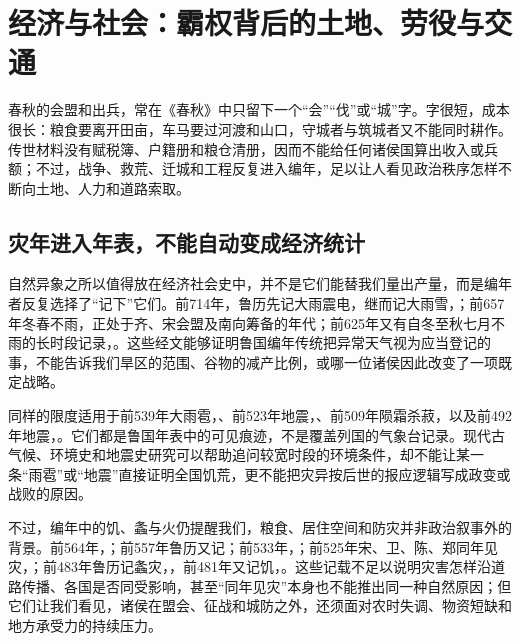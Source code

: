 \section{经济与社会：霸权背后的土地、劳役与交通}

春秋的会盟和出兵，常在《春秋》中只留下一个“会”“伐”或“城”字。字很短，成本很长：粮食要离开田亩，车马要过河渡和山口，守城者与筑城者又不能同时耕作。传世材料没有赋税簿、户籍册和粮仓清册，因而不能给任何诸侯国算出收入或兵额；不过，战争、救荒、迁城和工程反复进入编年，足以让人看见政治秩序怎样不断向土地、人力和道路索取。

\subsection{灾年进入年表，不能自动变成经济统计}

自然异象之所以值得放在经济社会史中，并不是它们能替我们量出产量，而是编年者反复选择了“记下”它们。前714年，鲁历先记大雨震电，继而记大雨雪，；前657年冬春不雨，正处于齐、宋会盟及南向筹备的年代；前625年又有自冬至秋七月不雨的长时段记录，。这些经文能够证明鲁国编年传统把异常天气视为应当登记的事，不能告诉我们旱区的范围、谷物的减产比例，或哪一位诸侯因此改变了一项既定战略。

同样的限度适用于前539年大雨雹，、前523年地震，、前509年陨霜杀菽，以及前492年地震，。它们都是鲁国年表中的可见痕迹，不是覆盖列国的气象台记录。现代古气候、环境史和地震史研究可以帮助追问较宽时段的环境条件，却不能让某一条“雨雹”或“地震”直接证明全国饥荒，更不能把灾异按后世的报应逻辑写成政变或战败的原因。

不过，编年中的饥、螽与火仍提醒我们，粮食、居住空间和防灾并非政治叙事外的背景。前564年，；前557年鲁历又记；前533年，；前525年宋、卫、陈、郑同年见灾，；前483年鲁历记螽灾，，前481年又记饥，。这些记载不足以说明灾害怎样沿道路传播、各国是否同受影响，甚至“同年见灾”本身也不能推出同一种自然原因；但它们让我们看见，诸侯在盟会、征战和城防之外，还须面对农时失调、物资短缺和地方承受力的持续压力。

